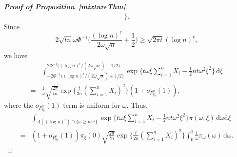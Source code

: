 \documentclass[11pt]{article}
\theoremstyle{plain}
\theoremstyle{definition}
\theoremstyle{remark}
\begin{document}
\begin{appendices}
\begin{proof}[\textbf{Proof of Proposition~\ref{mixtureThm}}]
\begin{align*}
\bigg\}.
\end{align*}
Since
\begin{equation*}
    2\sqrt{tn}\omega \Phi^{-1}\Big(\frac{(\log n)^r}{2\omega\sqrt{n}}+\frac 12\Big)
    \geq 
    \sqrt{2\pi t} (\log n)^r,
\end{equation*}
we have
\begin{align*}
    &\int_{-2\Phi^{-1}\big((\log n)^r/(2\omega \sqrt{n})+1/2\big)}^{2\Phi^{-1}\big((\log n)^r/(2\omega \sqrt{n})+1/2\big)} \exp\big\{
        t\omega \xi \sum_{i=1}^n X_i -\frac{1}{2} nt\omega^2 \xi^2
    \big\} \, \mathrm d\xi
\\
=&
 \frac{1}{\omega}\sqrt{\frac{2\pi}{tn}}  \exp\Big\{\frac{t}{2n}(\sum_{i=1}^n X_i)^2\Big\}
(1+o_{P^n_{\theta_0}}(1)),
\end{align*}
where the $o_{P^n_{\theta_0}}(1)$ term is uniform for $\omega$.
Thus,
\begin{align*}
    &\int_{A((\log n)^r)\cap \{\omega\geq n^{-s}\} } \exp\big\{
        t\omega \xi \sum_{i=1}^n X_i -\frac{1}{2} nt\omega^2 \xi^2
    \big\} \pi(\omega,\xi)\, \mathrm d\omega \mathrm d\xi
    \\
=&(1+o_{P^n_{\theta_0}}(1))\pi_{\xi}(0)\sqrt{\frac{2\pi}{tn}}\exp \Big\{ \frac{t}{2n}(\sum_{i=1}^n X_i)^2\Big\} 
\int_{0}^1 
\frac{1}{\omega}
\pi_{\omega}(\omega)\, \mathrm d\omega.
\end{align*}



\end{proof}
\end{appendices}
\end{document}
